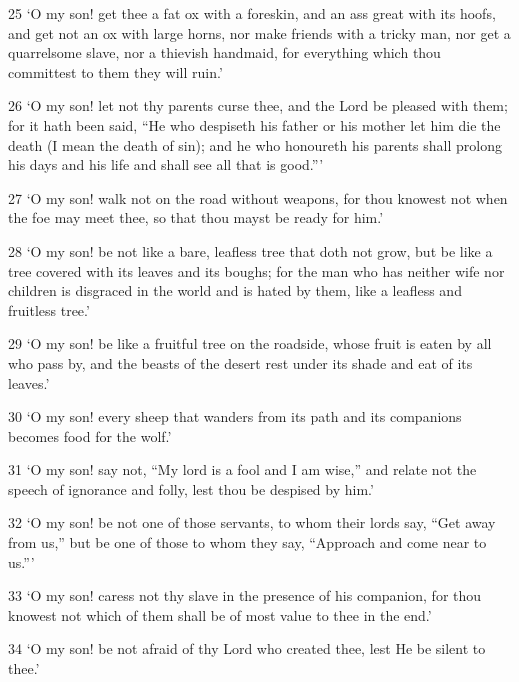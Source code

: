\par 25 ‘O my son! get thee a fat ox with a foreskin, and an ass great with its hoofs, and get not an ox with large horns, nor make friends with a tricky man, nor get a quarrelsome slave, nor a thievish handmaid, for everything which thou committest to them they will ruin.’

\par 26 ‘O my son! let not thy parents curse thee, and the Lord be pleased with them; for it hath been said, “He who despiseth his father or his mother let him die the death (I mean the death of sin); and he who honoureth his parents shall prolong his days and his life and shall see all that is good.”’

\par 27 ‘O my son! walk not on the road without weapons, for thou knowest not when the foe may meet thee, so that thou mayst be ready for him.’

\par 28 ‘O my son! be not like a bare, leafless tree that doth not grow, but be like a tree covered with its leaves and its boughs; for the man who has neither wife nor children is disgraced in the world and is hated by them, like a leafless and fruitless tree.’

\par 29 ‘O my son! be like a fruitful tree on the roadside, whose fruit is eaten by all who pass by, and the beasts of the desert rest under its shade and eat of its leaves.’

\par 30 ‘O my son! every sheep that wanders from its path and its companions becomes food for the wolf.’

\par 31 ‘O my son! say not, “My lord is a fool and I am wise,” and relate not the speech of ignorance and folly, lest thou be despised by him.’

\par 32 ‘O my son! be not one of those servants, to whom their lords say, “Get away from us,” but be one of those to whom they say, “Approach and come near to us.”’

\par 33 ‘O my son! caress not thy slave in the presence of his companion, for thou knowest not which of them shall be of most value to thee in the end.’

\par 34 ‘O my son! be not afraid of thy Lord who created thee, lest He be silent to thee.’

